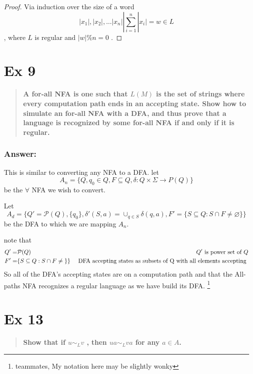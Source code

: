 \documentclass[titlepage]{article}\usepackage[]{graphicx}\usepackage[]{color}
\begin{document}
\begin{proof}
  Via induction over the size of a word 
  \[ |x_1|, |x_2|, \dots |x_n| | \sum_{i=1}^n |x_i| = w \in L \]
  , where $L$ is regular and $|w|\%n=0 $ .

\end{proof}




\section*{Ex 9}
\begin{quote}
  \textbf{A for-all NFA is one such that $L(M)$ is the set of strings where every
  computation path ends in an accepting state. Show how to simulate an for-all
  NFA with a DFA, and thus prove that a language is recognized by some for-all
  NFA if and only if it is regular.}
\end{quote}

\subsubsection*{Answer:}
This is similar to converting any NFA to a DFA. 
let \[ A_n = \{ Q, q_0 \in Q, F \subseteq Q, \delta : Q \times \Sigma \to P(Q) \} \]
  be the $\forall$ NFA we wish to convert.

Let \[ A_d = \{Q' = \mathcal{P}(Q), \{ q_0 \}, \delta'(S,a) = \cup_{q \in S}
\delta(q,a), F' = \{ S \subseteq Q : S \cap F \neq \varnothing \} \} \]
be the DFA to which we are mapping $A_n$.

note that
\begin{align*}
  Q' =& \mathcal{P}(Q)& Q' \text{ is power set of } Q \\ 
  F' =& \{ S \subseteq Q : S \cap F \neq \null \} \} &\text{ DFA accepting states
  as subsets of Q with all elements accepting } 
\end{align*}
So all of the DFA's accepting states are on a computation path and that the
All-paths NFA recognizes a regular language as we have build its DFA.
\footnote{teammates, My notation here may be slightly wonky}



\section*{Ex 13}
\begin{quote}
  \textbf{Show that if $u \sim_L v$ , then $u a \sim_L v a$ for any $a \in A$.}
\end{quote}
\end{document}

